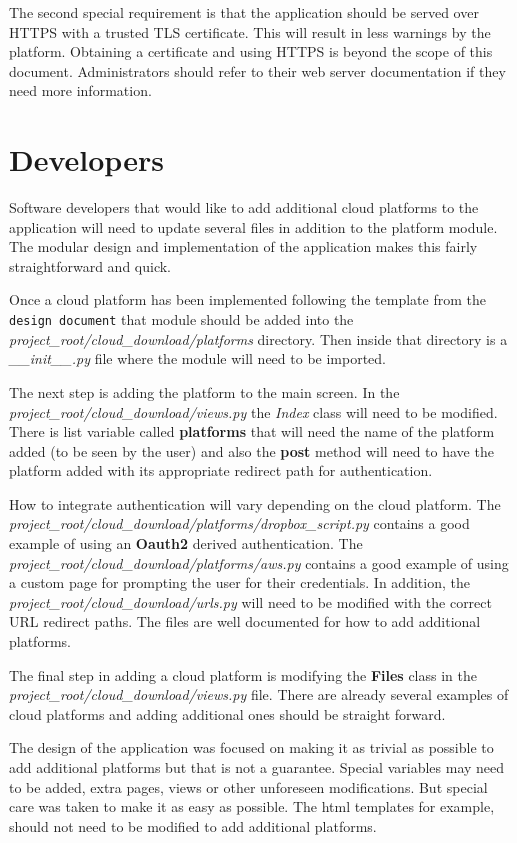 \documentclass{article}
\begin{document}
      The second special requirement is that the application should be served over HTTPS with a trusted TLS certificate. This will result in less warnings by the platform. Obtaining a certificate and using HTTPS is beyond the scope
      of this document. Administrators should refer to their web server documentation if they need more information.

    \section{Developers}
    Software developers that would like to add additional cloud platforms to the application will need to update several files in addition to the platform module. The modular design and implementation of the application makes this
    fairly straightforward and quick.

    Once a cloud platform has been implemented following the template from the \texttt{design document} that module should be added into the \textit{project\_root/cloud\_download/platforms} directory. Then inside that directory
    is a \textit{\_\_init\_\_.py} file where the module will need to be imported.

    The next step is adding the platform to the main screen. In the \textit{project\_root/cloud\_download/views.py} the \textit{Index} class will need to be modified. There is list variable called \textbf{platforms} that will need
    the name of the platform added (to be seen by the user) and also the \textbf{post} method will need to have the platform added with its appropriate redirect path for authentication.

    How to integrate authentication will vary depending on the cloud platform. The \textit{project\_root/cloud\_download/platforms/dropbox\_script.py} contains a good example of using an \textbf{Oauth2} derived authentication.
    The \textit{project\_root/cloud\_download/platforms/aws.py} contains a good example of using a custom page for prompting the user for their credentials. In addition, the
    \textit{project\_root/cloud\_download/urls.py} will need to be modified with the correct URL redirect paths. The files are well documented for how to add additional platforms.

    The final step in adding a cloud platform is modifying the \textbf{Files} class in the \textit{project\_root/cloud\_download/views.py} file. There are already several examples of cloud platforms and adding additional ones should
    be straight forward.

    The design of the application was focused on making it as trivial as possible to add additional platforms but that is not a guarantee. Special variables may need to be added, extra pages, views or other unforeseen modifications.
    But special care was taken to make it as easy as possible. The html templates for example, should not need to be modified to add additional platforms.
\end{document}
